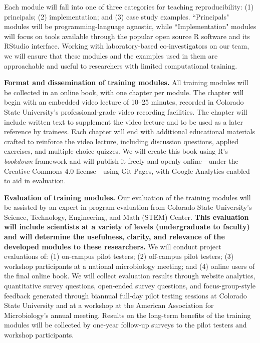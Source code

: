 \documentclass[pdftex,english,11.5pt,parskip=half]{scrartcl}
\begin{document}
Each module will fall into one of three categories for teaching reproducibility: (1) principals; (2) implementation; and (3) case study examples. ``Principals" modules will be programming-language agnostic, while ``Implementation" modules will focus on tools available through the popular open source R software and its RStudio interface. Working with laboratory-based co-investigators on our team, we will ensure that these modules and the examples used in them are approachable and useful to researchers with limited computational training.  

\textbf{Format and dissemination of training modules.} All training modules will be collected in an online book, with one chapter per module. The chapter will begin with an embedded video lecture of 10--25 minutes, recorded in Colorado State University's professional-grade video recording facilities. The chapter will include written text to supplement the video lecture and to be used as a later reference by trainees. Each chapter will end with additional educational materials crafted to reinforce the video lecture, including discussion questions, applied exercises, and multiple choice quizzes. We will create this book using R's \textit{bookdown} framework and will publish it freely and openly online---under the Creative Commons 4.0 license---using Git Pages, with Google Analytics enabled to aid in evaluation. 

\textbf{Evaluation of training modules.} Our evaluation of the training modules will be assisted by an expert in program evaluation from Colorado State University's Science, Technology, Engineering, and Math (STEM) Center. \textbf{This evaluation will include scientists at a variety of levels (undergraduate to faculty) and will determine the usefulness, clarity, and relevance of the developed modules to these researchers.} We will conduct project evaluations of: (1) on-campus pilot testers; (2) off-campus pilot testers; (3) workshop participants at a national microbiology meeting; and (4) online users of the final online book. We will collect evaluation results through website analytics, quantitative survey questions, open-ended survey questions, and focus-group-style feedback generated through biannual full-day pilot testing sessions at Colorado State University and at a workshop at the American Association for Microbiology's annual meeting. Results on the long-term benefits of the training modules will be collected by one-year follow-up surveys to the pilot testers and workshop participants.
\end{document}
